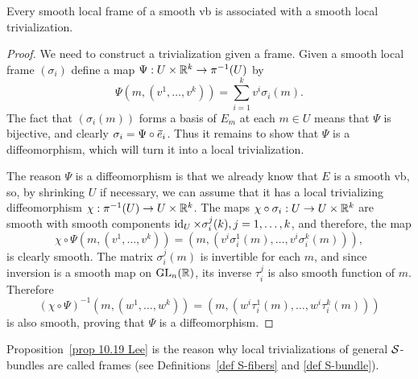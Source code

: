 \begin{prop}\label{prop 10.19 Lee}
    Every smooth local frame of a smooth \gls{vb} is associated with a smooth local trivialization.
\end{prop}
\begin{proof}
    We need to construct a trivialization given a frame. Given a smooth local frame $(\sigma_i)$ define a map $\Psi:U\times\mathbb{R}^k\to \pi^{-1}(U)$ by
    \[\Psi(m,(v^1,\ldots,v^k))=\sum_{i=1}^k v^i\sigma_i(m).\]
    The fact that $(\sigma_i(m))$ forms a basis of $E_m$ at each $m\in U$ means that $\Psi$ is bijective, and clearly $\sigma_i=\Psi\circ \wt{e}_i$.  Thus it remains to show that $\Psi$ is a diffeomorphism, which will turn it into a local trivialization.

    The reason $\Psi$ is a diffeomorphism is that we already know that $E$ is a smooth \gls{vb}, so, by shrinking $U$ if necessary, we can assume that it has a local trivializing diffeomorphism $\chi:\pi^{-1}(U)\to U\times\mathbb{R}^k$. The maps $\chi\circ \sigma_i:U\to U\times\mathbb{R}^k$ are smooth with smooth components $\operatorname{id}_U\times \sigma^j_i(k),j=1,\ldots,k$, and therefore, the map
    \[\chi\circ\Psi(m,(v^1,\ldots,v^k))=(m,(v^i\sigma^1_i(m),\ldots,v^i\sigma^k_i(m))),\]
    is clearly smooth. The matrix $\sigma_i^j(m)$ is invertible for each $m$, and since inversion is a smooth map on $\operatorname{GL}_n(\mathbb{R})$, its inverse $\tau_i^j$ is also smooth function of $m$. Therefore
    \[(\chi\circ\Psi)^{-1}(m,(w^1,\ldots,w^k))=(m,(w^i\tau_i^1(m),\ldots,w^i\tau_i^k(m)))\]
    is also smooth, proving that $\Psi$ is a diffeomorphism.
\end{proof}

\begin{rem}
    Proposition~\ref{prop 10.19 Lee} is the reason why local trivializations of general $\mathcal{S}$-bundles are called frames (see Definitions~\ref{def S-fibers} and \ref{def S-bundle}).
\end{rem}

